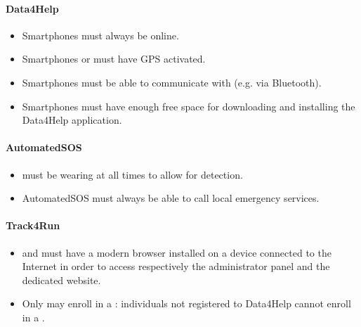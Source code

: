 \documentclass[../../rasd.tex]{subfiles}
\begin{document}
			\paragraph{Data4Help}
			 	\begin{itemize}	
			 		\item Smartphones must always be online.
			 		\item Smartphones or  must have GPS activated.
			 		\item Smartphones must be able to communicate with  (e.g. via Bluetooth).
			 		\item Smartphones must have enough free space for downloading and installing the Data4Help application.
			 	\end{itemize}
			 \paragraph{AutomatedSOS}
			 	\begin{itemize}
			 		\item {} must be wearing  at all times to allow for  detection.
			 		\item AutomatedSOS must always be able to call local emergency services.
			 	\end{itemize}
			 \paragraph{Track4Run}
			 	\begin{itemize}
			 		\item {} and  must have a modern browser installed on a device connected to the Internet in order to access respectively the  administrator panel and the  dedicated website.
			 		\item Only  may enroll in a : individuals not registered to Data4Help cannot enroll in a .
			 	\end{itemize}
\end{document}
